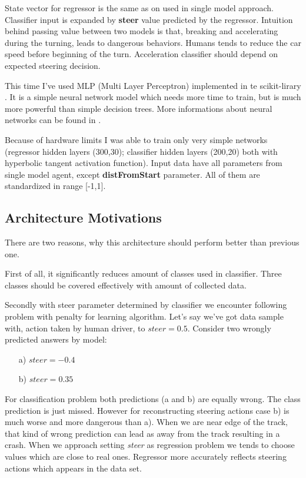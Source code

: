 \documentclass[declaration,shortabstract,english,inz]{iithesis}
\begin{document}
State vector for regressor is the same as on used in single model approach.
Classifier input is expanded by \textbf{steer} value predicted by the regressor.
Intuition behind passing value between two models is that, breaking and accelerating during the turning, leads to dangerous behaviors.
Humans tends to reduce the car speed before beginning of the turn.
Acceleration classifier should depend on expected steering decision.


This time I've used MLP (Multi Layer Perceptron) implemented in te scikit-lirary \cite{scikit_learn}.
It is a simple neural network model which needs more time to train, but is much more powerful than simple decision trees. More informations about neural networks can be found in \cite{neuraln_nets}.


Because of hardware limits I was able to train only very simple networks (regressor hidden layers (300,30); classifier hidden layers (200,20) both with hyperbolic tangent activation function).
Input data have all parameters from single model agent, except \textbf{distFromStart} parameter.
All of them are standardized in range [-1,1].

\subsection{Architecture Motivations}

There are two reasons, why this architecture should perform better than previous one.

First of all, it significantly reduces amount of classes used in classifier.
Three classes should be covered effectively with amount of collected data.

Secondly with steer parameter determined by classifier we encounter following problem with penalty for learning algorithm.
Let's say we've got data sample with, action taken by human driver, to $steer=0.5$.
Consider two wrongly predicted answers by model:
\begin{itemize}
    \item[a)] $steer=-0.4$
    \item[b)] $steer=0.35$
\end{itemize}

For classification problem both predictions (a and b) are equally wrong.
 The class prediction is just missed.
However for reconstructing steering actions case b) is much worse and more dangerous than a).
When we are near edge of the track, that kind of wrong prediction can lead as away from the track resulting in a crash.
When we approach setting \textit{steer} as regression problem we tends to choose values which are close to real ones.
Regressor more accurately reflects steering actions which appears in the data set.
\end{document}

